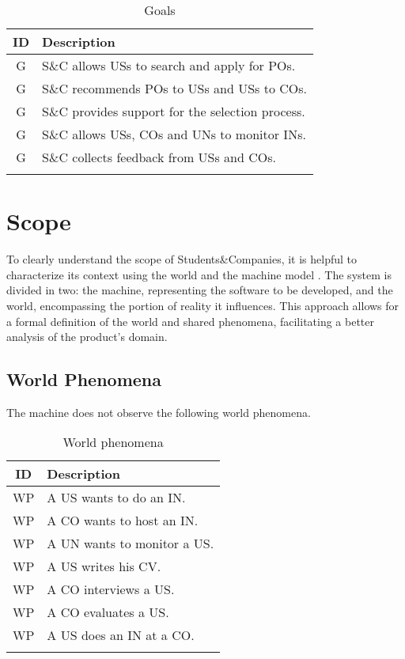 \setcounter{g}{1}
\newcommand{\gc}{\theg\stepcounter{g}}
\renewcommand{\arraystretch}{1.5}
\begin{longtable}{|c|p{10.5cm}|}
    \hline \rowcolor{polimiblue!40}
    \textbf{ID} & \textbf{Description} \\ \hline
    G\gc & S\&C allows USs to search and apply for POs. \\ \hline
    G\gc & S\&C recommends POs to USs and USs to COs. \\ \hline
    G\gc & S\&C provides support for the selection process. \\ \hline
    G\gc & S\&C allows USs, COs and UNs to monitor INs. \\ \hline
    G\gc & S\&C collects feedback from USs and COs. \\ \hline
\caption{Goals}
\end{longtable}

\section{Scope}
To clearly understand the scope of Students\&Companies, it is helpful to characterize its context using the world and the machine model \cite{jackson1995}.
The system is divided in two: the machine, representing the software to be developed, and the world, encompassing the portion of reality it influences.
This approach allows for a formal definition of the world and shared phenomena, facilitating a better analysis of the product's domain.

\subsection{World Phenomena}
The machine does not observe the following world phenomena.

\setcounter{wp}{1}
\newcommand{\wpc}{\thewp\stepcounter{wp}}
\renewcommand{\arraystretch}{1.5}
\begin{longtable}{|c|p{10.5cm}|}
    \hline \rowcolor{polimiblue!40}
    \textbf{ID} & \textbf{Description} \\ \hline
    WP\wpc & A US wants to do an IN. \\ \hline
    WP\wpc & A CO wants to host an IN. \\ \hline
    WP\wpc & A UN wants to monitor a US. \\ \hline
    WP\wpc & A US writes his CV. \\ \hline
    WP\wpc & A CO interviews a US. \\ \hline
    WP\wpc & A CO evaluates a US. \\ \hline
    WP\wpc & A US does an IN at a CO. \\ \hline
\caption{World phenomena}
\end{longtable}

